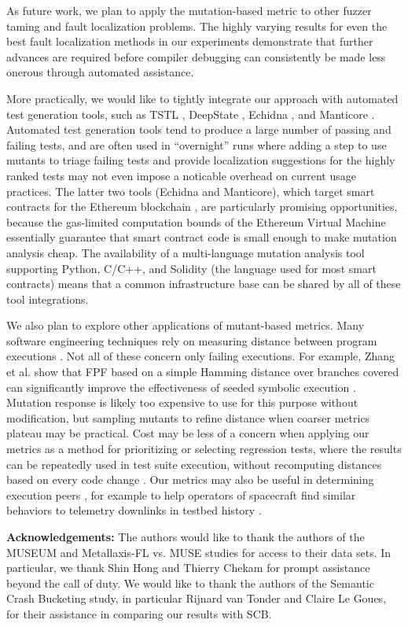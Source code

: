 As future work, we plan to apply the mutation-based metric to other
fuzzer taming and fault localization problems.  The highly varying
results for even the best fault localization methods in our
experiments demonstrate that further advances are required before
compiler debugging can consistently be made less onerous through automated
assistance.

More practically, we would like to tightly integrate our approach with
automated test generation tools, such as TSTL \cite{tstlsttt,NFM15,ISSTA15},
DeepState \cite{DeepState,DeepStateTutorial}, Echidna \cite{Echidna}, and
Manticore \cite{Manticore}.  Automated test generation tools tend to produce a
large number of passing and failing tests, and are often used in
``overnight'' runs where adding a step to use mutants to triage
failing tests and provide localization suggestions for the highly
ranked tests may not even impose a noticable overhead on current usage
practices.  The latter two tools (Echidna and Manticore), which target smart
contracts for the Ethereum blockchain \cite{wood2014ethereum}, are
particularly promising opportunities, because the gas-limited computation bounds of the Ethereum
Virtual Machine essentially guarantee that smart contract code is
small enough to make mutation analysis cheap.  The availability of a
multi-language mutation analysis tool \cite{RegExpMut} supporting
Python, C/C++, and Solidity (the language used for most smart
contracts) means that a common infrastructure base can be shared by
all of these tool integrations.

We also plan to explore other applications of mutant-based metrics.
Many software engineering techniques rely on measuring distance
between program executions \cite{BallConcept,NearNeighbor}.  Not all
of these concern only failing
executions.  For example, Zhang et al. \cite{issta14} show that FPF based on a simple
Hamming distance over branches covered can significantly improve the
effectiveness of seeded symbolic execution
\cite{Zesti,PersonSeed,BugRedux}.  Mutation response is likely too
expensive to use for this purpose without modification, but sampling
mutants to refine distance when coarser metrics plateau
may be practical.  Cost may be less of a concern when applying our
metrics as a method for prioritizing or selecting regression tests,
where the results can be repeatedly used in test suite execution,
without recomputing distances based on every code change
\cite{YooHarman}.  Our metrics may also be useful in determining
execution peers \cite{Sumner2011}, for example to help operators of
spacecraft find similar behaviors to telemetry downlinks in testbed
history \cite{KlausRajeev,scriptstospecs}.

{\scriptsize {\bf Acknowledgements:} The authors would like to thank the authors of
the MUSEUM \cite{multilingual} and Metallaxis-FL vs. MUSE 
\cite{Papadakis} studies for access to their data sets.  In
particular, we thank Shin Hong and Thierry Chekam for prompt
assistance beyond the call of duty.  We would like to thank the
authors of the Semantic Crash Bucketing \cite{SCB} study, in
particular Rijnard van Tonder and Claire Le Goues, for their assistance in
comparing our results with SCB.}